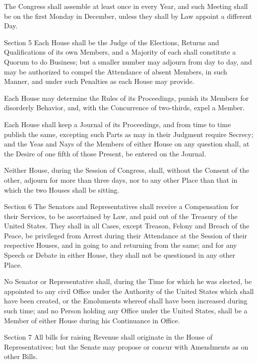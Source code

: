 \documentclass{article}
\begin{document}
The Congress shall assemble at least once in every Year, and such Meeting shall
be on the first Monday in December, unless they shall by Law appoint a
different Day.

Section 5
Each House shall be the Judge of the Elections, Returns and Qualifications of
its own Members, and a Majority of each shall constitute a Quorum to do
Business; but a smaller number may adjourn from day to day, and may be
authorized to compel the Attendance of absent Members, in such Manner, and
under such Penalties as each House may provide.

Each House may determine the Rules of its Proceedings, punish its Members for
disorderly Behavior, and, with the Concurrence of two-thirds, expel a Member.

Each House shall keep a Journal of its Proceedings, and from time to time
publish the same, excepting such Parts as may in their Judgment require
Secrecy; and the Yeas and Nays of the Members of either House on any question
shall, at the Desire of one fifth of those Present, be entered on the Journal.

Neither House, during the Session of Congress, shall, without the Consent of
the other, adjourn for more than three days, nor to any other Place than that
in which the two Houses shall be sitting.

Section 6
The Senators and Representatives shall receive a Compensation for their
Services, to be ascertained by Law, and paid out of the Treasury of the United
States. They shall in all Cases, except Treason, Felony and Breach of the
Peace, be privileged from Arrest during their Attendance at the Session of
their respective Houses, and in going to and returning from the same; and for
any Speech or Debate in either House, they shall not be questioned in any other
Place.

No Senator or Representative shall, during the Time for which he was elected,
be appointed to any civil Office under the Authority of the United States which
shall have been created, or the Emoluments whereof shall have been increased
during such time; and no Person holding any Office under the United States,
shall be a Member of either House during his Continuance in Office.


Section 7
All bills for raising Revenue shall originate in the House of Representatives;
but the Senate may propose or concur with Amendments as on other Bills.
\end{document}
